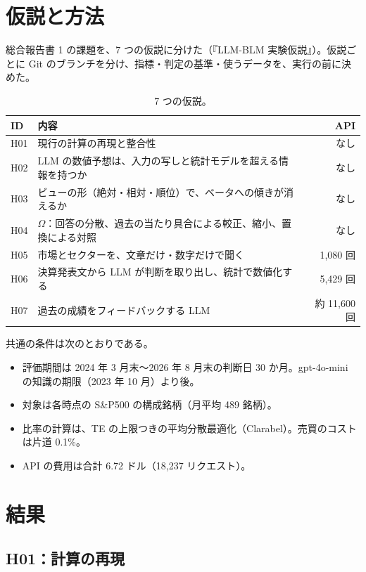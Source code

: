 \documentclass[xelatex,ja=standard,jafont=haranoaji,a4paper,10pt]{bxjsreport}
\newcommand{\SP}{S\&P500}
\begin{document}
\chapter{仮説と方法}\label{ch:hyp}

総合報告書 1 の課題を、7 つの仮説に分けた（『LLM-BLM 実験仮説』）。仮説ごとに Git のブランチを分け、指標・判定の基準・使うデータを、実行の前に決めた。

\begin{table}[H]
\centering
\caption{7 つの仮説。}
\small
\begin{tabular}{lp{9.5cm}r}
\toprule
ID & 内容 & API \\
\midrule
H01 & 現行の計算の再現と整合性 & なし \\
H02 & LLM の数値予想は、入力の写しと統計モデルを超える情報を持つか & なし \\
H03 & ビューの形（絶対・相対・順位）で、ベータへの傾きが消えるか & なし \\
H04 & $\Omega$：回答の分散、過去の当たり具合による較正、縮小、置換による対照 & なし \\
H05 & 市場とセクターを、文章だけ・数字だけで聞く & 1,080 回 \\
H06 & 決算発表文から LLM が判断を取り出し、統計で数値化する & 5,429 回 \\
H07 & 過去の成績をフィードバックする LLM & 約 11,600 回 \\
\bottomrule
\end{tabular}
\end{table}

共通の条件は次のとおりである。

\begin{itemize}
\item 評価期間は 2024 年 3 月末〜2026 年 8 月末の判断日 30 か月。gpt-4o-mini の知識の期限（2023 年 10 月）より後。
\item 対象は各時点の \SP{} の構成銘柄（月平均 489 銘柄）。
\item 比率の計算は、TE の上限つきの平均分散最適化（Clarabel）。売買のコストは片道 0.1\%。
\item API の費用は合計 6.72 ドル（18,237 リクエスト）。
\end{itemize}

\chapter{結果}\label{ch:hresult}

\section{H01：計算の再現}
\end{document}
